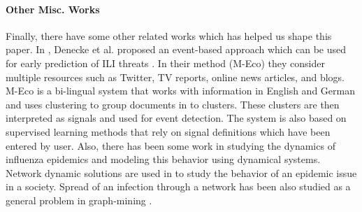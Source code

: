 \paragraph{Other Misc. Works}
Finally, there have some other related works which has helped us shape this paper. 
In \cite{ref3}, Denecke et al.
proposed an event-based approach which can be used for early prediction
of ILI threats \cite{ref3}. In their method (M-Eco) they consider
multiple resources such as Twitter, TV reports, online news articles,
and blogs. M-Eco is a bi-lingual system that works with information in
English and German and uses clustering to group documents in to
clusters. These clusters are then interpreted as signals and used for
event detection. The system is also based on supervised learning methods
that rely on signal definitions which have been entered by user.
Also, there has been some work in studying the dynamics of influenza epidemics and
modeling this behavior using dynamical systems. Network dynamic solutions are used in
\cite{ref11} to study the behavior of an epidemic issue in a society.
Spread of an infection through a network has been also studied as a
general problem in graph-mining \cite{ref13} \cite{ref14}. 
 
